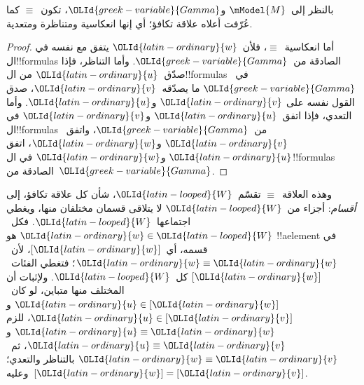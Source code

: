 \documentclass[../../../include/open-logic-section]{subfiles}
\begin{document}
\begin{prop}
  بالنظر إلى~$\mModel{M}$ و${\OLId{greek-variable}{Gamma}}$، تكون~$\equiv$ كما عُرّفت أعلاه
  علاقة تكافؤ؛ أي إنها انعكاسية ومتناظرة ومتعدية.
\end{prop}

\begin{proof}
  أما انعكاسية~$\equiv$، فلأن~${\OLId{latin-ordinary}{w}}$ يتفق مع نفسه
  في ال!!{formula}s الصادقة من~${\OLId{greek-variable}{Gamma}}$.
  وأما التناظر، فإذا صدّق~${\OLId{latin-ordinary}{u}}$ من ال!!{formula}s
  في~${\OLId{greek-variable}{Gamma}}$ ما يصدّقه~${\OLId{latin-ordinary}{v}}$، صدق القول نفسه على
  ${\OLId{latin-ordinary}{v}}$ و${\OLId{latin-ordinary}{u}}$. وأما التعدي، فإذا اتفق~${\OLId{latin-ordinary}{u}}$ و${\OLId{latin-ordinary}{v}}$
  في ال!!{formula}s من~${\OLId{greek-variable}{Gamma}}$، واتفق~${\OLId{latin-ordinary}{v}}$ و${\OLId{latin-ordinary}{w}}$،
  اتفق ${\OLId{latin-ordinary}{u}}$ و${\OLId{latin-ordinary}{w}}$ في ال!!{formula}s الصادقة
  من~${\OLId{greek-variable}{Gamma}}$.
\end{proof}

وهذه العلاقة~$\equiv$ تقسّم~${\OLId{latin-looped}{W}}$، شأن كل علاقة
تكافؤ، إلى \emph{أقسام}: أجزاء من~${\OLId{latin-looped}{W}}$ لا يتلاقى
قسمان مختلفان منها، ويغطي اجتماعها~${\OLId{latin-looped}{W}}$.
فكل~${\OLId{latin-ordinary}{w}} \in {\OLId{latin-looped}{W}}$ هو !!a{element} في قسمه،
أي~$[{\OLId{latin-ordinary}{w}}]$، لأن~${\OLId{latin-ordinary}{w}} \equiv {\OLId{latin-ordinary}{w}}$؛ فتغطي الفئات~$[{\OLId{latin-ordinary}{w}}]$
كل~${\OLId{latin-looped}{W}}$. ولإثبات أن المختلف منها متباين،
لو كان~${\OLId{latin-ordinary}{u}} \in [{\OLId{latin-ordinary}{w}}]$ و${\OLId{latin-ordinary}{u}} \in [{\OLId{latin-ordinary}{v}}]$، للزم
${\OLId{latin-ordinary}{u}} \equiv {\OLId{latin-ordinary}{w}}$ و${\OLId{latin-ordinary}{u}} \equiv {\OLId{latin-ordinary}{v}}$، ثم~${\OLId{latin-ordinary}{w}} \equiv {\OLId{latin-ordinary}{v}}$
بالتناظر والتعدي؛ وعليه~$[{\OLId{latin-ordinary}{w}}]=[{\OLId{latin-ordinary}{v}}]$.
\end{document}
